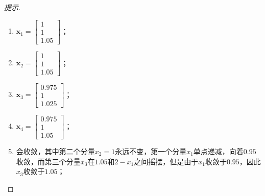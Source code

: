 \documentclass[UTF8]{ctexart}
\begin{document}
\begin{proof}[提示]
\begin{enumerate}
\item $\bm x_1=\begin{bmatrix}1\\1\\1.05\end{bmatrix}$；
\item $\bm x_2=\begin{bmatrix}1\\1\\1.05\end{bmatrix}$；
\item $\bm x_3=\begin{bmatrix}0.975\\1\\1.025\end{bmatrix}$；
\item $\bm x_4=\begin{bmatrix}0.975\\1\\1.05\end{bmatrix}$；
\item 会收敛，其中第二个分量$x_2=1$永远不变，第一个分量$x_1$单点递减，向着$0.95$收敛，而第三个分量$x_3$在$1.05$和$2-x_1$之间摇摆，但是由于$x_1$收敛于$0.95$，因此$x_3$收敛于$1.05$；
\end{enumerate}
\end{proof}
\end{document}
